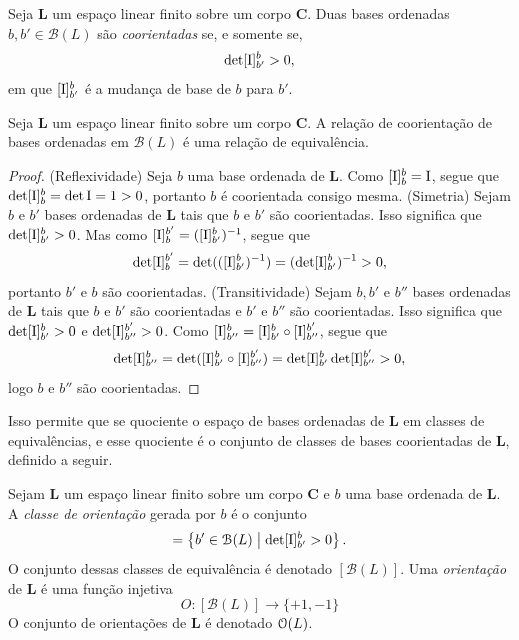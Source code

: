 \begin{definition}
Seja $\bm L$ um espaço linear finito sobre um corpo $\bm C$. Duas bases ordenadas $b, b' \in \mathcal{B}(L)$ são \emph{coorientadas} se, e somente se,
	\begin{equation*}
	\det [\mathrm{I}]^b_{b'} > 0,
	\end{equation*}
em que $[\mathrm{I}]_{b'}^b$ é a mudança de base de $b$ para $b'$.
\end{definition}

\begin{proposition}
Seja $\bm L$ um espaço linear finito sobre um corpo $\bm C$. A relação de coorientação de bases ordenadas em $\mathcal{B}(L)$ é uma relação de equivalência.
\end{proposition}
\begin{proof}
(Reflexividade) Seja $b$ uma base ordenada de $\bm L$. Como $[\mathrm{I}]^b_b = \mathrm{I}$, segue que $\det [\mathrm{I}]^b_b = \det \mathrm{I} = 1 >0$, portanto $b$ é coorientada consigo mesma.
(Simetria) Sejam $b$ e $b'$ bases ordenadas de $\bm L$ tais que $b$ e $b'$ são coorientadas. Isso significa que $\det [\mathrm{I}]^b_{b'} >0$. Mas como $[\mathrm{I}]_b^{b'} = ([\mathrm{I}]^b_{b'})^{-1}$, segue que
	\begin{equation*}
	\det [\mathrm{I}]_b^{b'} = \det(([\mathrm{I}]^b_{b'})^{-1}) = (\det [\mathrm{I}]^b_{b'})^{-1} > 0,
	\end{equation*}
portanto $b'$ e $b$ são coorientadas.
(Transitividade) Sejam $b,b'$ e $b''$ bases ordenadas de $\bm L$ tais que $b$ e $b'$ são coorientadas e $b'$ e $b''$ são coorientadas. Isso significa que $\det [\mathrm{I}]^b_{b'} > 0$ e $\det [\mathrm{I}]^{b'}_{b''} > 0$. Como $[\mathrm{I}]^b_{b''} = [\mathrm{I}]^b_{b'} \circ [\mathrm{I}]^{b'}_{b''}$, segue que
	\begin{equation*}
	\det [\mathrm{I}]^b_{b''} = \det ( [\mathrm{I}]^b_{b'} \circ [\mathrm{I}]^{b'}_{b''}) = \det  [\mathrm{I}]^b_{b'} \det [\mathrm{I}]^{b'}_{b''} > 0,
	\end{equation*}
logo $b$ e $b''$ são coorientadas.
\end{proof}

Isso permite que se quociente o espaço de bases ordenadas de $\bm L$ em classes de equivalências, e esse quociente é o conjunto de classes de bases coorientadas de $\bm L$, definido a seguir.

\begin{definition}
Sejam $\bm L$ um espaço linear finito sobre um corpo $\bm C$ e $b$ uma base ordenada de $\bm L$. A \emph{classe de orientação} gerada por $b$ é o conjunto
	\begin{equation*}
	[b] = \set{b' \in \mathcal{B}(L)}{\det [\Id]^b_{b'} > 0}.
	\end{equation*}
O conjunto dessas classes de equivalência é denotado $[\mathcal{B}(L)]$. Uma \emph{orientação} de $\bm L$ é uma função injetiva
	\begin{equation*}
	O\colon [\mathcal{B}(L)] \to \{+1,-1\}
	\end{equation*}
O conjunto de orientações de $\bm L$ é denotado $\mathcal{O}(L)$.
\end{definition}

